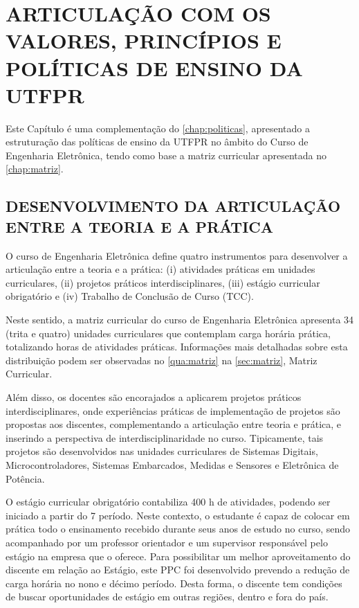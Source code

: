 \chapter{ARTICULAÇÃO COM OS VALORES, PRINCÍPIOS E POLÍTICAS DE ENSINO DA UTFPR}

Este Capítulo é uma complementação do \autoref{chap:politicas}, apresentado a estruturação das políticas de ensino da UTFPR no âmbito do Curso de Engenharia Eletrônica, tendo como base a matriz curricular apresentada no \autoref{chap:matriz}.

\section{DESENVOLVIMENTO DA ARTICULAÇÃO ENTRE A TEORIA E A PRÁTICA}

O curso de Engenharia Eletrônica define quatro instrumentos para desenvolver a articulação entre a teoria e a prática: (i) atividades práticas em unidades curriculares, (ii) projetos práticos interdisciplinares, (iii) estágio curricular obrigatório e (iv) Trabalho de Conclusão de Curso (TCC).

Neste sentido, a matriz curricular do curso de Engenharia Eletrônica apresenta 34 (trita e quatro) unidades curriculares que contemplam carga horária prática, totalizando \the\value{horasAP} horas de atividades práticas. Informações mais detalhadas sobre esta distribuição podem ser observadas no \autoref{qua:matriz} na \autoref{sec:matriz}, Matriz Curricular.

Além disso, os docentes são encorajados a aplicarem projetos práticos interdisciplinares, onde experiências práticas de implementação de projetos são propostas aos discentes, complementando a articulação entre teoria e prática, e inserindo a perspectiva de interdisciplinaridade no curso. Tipicamente, tais projetos são desenvolvidos nas unidades curriculares de Sistemas Digitais, Microcontroladores, Sistemas Embarcados, Medidas e Sensores e Eletrônica de Potência.

O estágio curricular obrigatório contabiliza 400 h de atividades, podendo ser iniciado a partir do 7\textordmasculine{} período. Neste contexto, o estudante é capaz de colocar em prática todo o ensinamento recebido durante seus anos de estudo no curso, sendo acompanhado por um professor orientador e um supervisor responsável pelo estágio na empresa que o oferece. Para possibilitar um melhor aproveitamento do discente em relação ao Estágio, este PPC foi desenvolvido prevendo a redução de carga horária no nono e décimo período. Desta forma, o discente tem condições de buscar oportunidades de estágio em outras regiões, dentro e fora do país.

